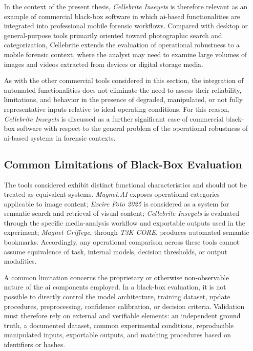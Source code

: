 In the context of the present thesis, \textit{Cellebrite Inseyets} is therefore
relevant as an example of commercial black-box software in which \gls{ai}-based
functionalities are integrated into professional mobile forensic workflows.
Compared with desktop or general-purpose tools primarily oriented toward
photographic search and categorization, Cellebrite extends the evaluation of
operational robustness to a mobile forensic context, where the analyst may need
to examine large volumes of images and videos extracted from devices or digital
storage media.

As with the other commercial tools considered in this section, the integration
of automated functionalities does not eliminate the need to assess their
reliability, limitations, and behavior in the presence of degraded, manipulated,
or not fully representative inputs relative to ideal operating conditions. For
this reason, \textit{Cellebrite Inseyets} is discussed as a further significant
case of commercial black-box software with respect to the general problem of
the operational robustness of \gls{ai}-based systems in forensic contexts.

\subsection{Common Limitations of Black-Box Evaluation}
\label{subsec:sota_black_box_limits}
The tools considered exhibit distinct functional characteristics and should not
be treated as equivalent systems. \textit{Magnet.AI} exposes operational
categories applicable to image content; \textit{Excire Foto 2025} is considered
as a system for semantic search and retrieval of visual content;
\textit{Cellebrite Inseyets} is evaluated through the specific media-analysis
workflow and exportable outputs used in the experiment; \textit{Magnet Griffeye}, through
\textit{T3K CORE}, produces automated semantic bookmarks. Accordingly, any
operational comparison across these tools cannot assume equivalence of task,
internal models, decision thresholds, or output modalities.

A common limitation concerns the proprietary or otherwise non-observable nature
of the \gls{ai} components employed. In a black-box evaluation, it is not
possible to directly control the model architecture, training dataset, update
procedures, preprocessing, confidence calibration, or decision criteria.
Validation must therefore rely on external and verifiable elements: an
independent ground truth, a documented dataset, common experimental conditions,
reproducible manipulated inputs, exportable outputs, and matching procedures
based on identifiers or hashes.

